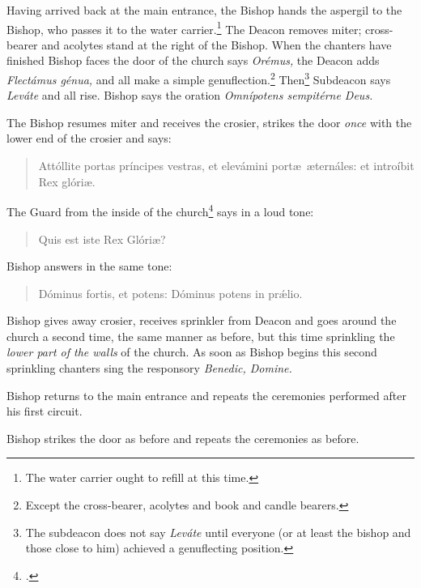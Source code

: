 \documentclass[letterpaper]{report}
\begin{document}
{\rubric Having arrived back at the main entrance, the Bishop hands the aspergil
to the Bishop, who passes it to the water carrier.\footnote{The water carrier
ought to refill at this time.} The Deacon removes miter; cross-bearer and
acolytes stand at the right of the Bishop. When the chanters have finished
Bishop faces the door of the church says \textit{Orémus,} the Deacon adds
\textit{Flectámus génua,} and all make a simple genuflection.\footnote{Except
the cross-bearer, acolytes and book and candle bearers.} Then\footnote{The
subdeacon does not say \textit{Leváte} until everyone (or at least the bishop
and those close to him) achieved a genuflecting position.} Subdeacon says
\textit{Leváte} and all rise. Bishop says the oration \textit{Omnípotens
sempitérne Deus.}

\rubric The Bishop resumes miter and receives the crosier, strikes the door
\textit{once} with the lower end of the crosier and says:

\begin{quote}
    Attóllite portas príncipes vestras, et elevámini port\ae\ \ae ternáles: et
    introíbit Rex glóri\ae.
\end{quote}

The Guard from the inside of the church\footcite[The door may be slightly open,
so that the Bishop and the Guard can hear each other.][note 1, p.
46.]{consecranda} says in a loud tone:

\begin{quote}
   Quis est iste Rex Glóri\ae? 
\end{quote}

Bishop answers in the same tone:

\begin{quote}
    Dóminus fortis, et potens: Dóminus potens in pr\'\ae lio.
\end{quote}


\rubric Bishop gives away crosier, receives sprinkler from Deacon and goes around the
church a second time, the same manner as before, but this time sprinkling the
\textit{lower part of the walls} of the church. As soon as Bishop begins this second
sprinkling chanters sing the responsory \textit{Benedic, Domine.}

\rubric Bishop returns to the main entrance and repeats the ceremonies performed
after his first circuit.

\rubric Bishop strikes the door as before and repeats the ceremonies as before.

}
\end{document}
